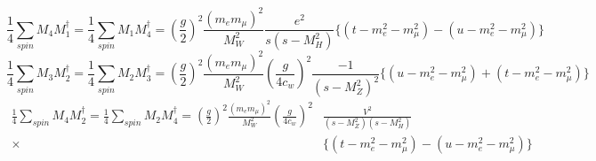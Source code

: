 \documentclass[11pt]{article}
\begin{document}
    \begin{equation}
    \frac{1}{4}\sum_{spin} M_4 M_1^{\dagger}=\frac{1}{4}\sum_{spin} M_1 M_4^{\dagger}=\left(\frac{g}{2}\right)^2\frac{(m_em_\mu)^2}{M_W^2}\frac{e^2}{s(s-M_H^2)}\{ (t-m_e^2-m_\mu^2)-(u-m_e^2-m_\mu^2) \}
    \end{equation}
    \begin{equation}
    \frac{1}{4}\sum_{spin} M_3 M_2^{\dagger}=\frac{1}{4}\sum_{spin} M_2 M_3^{\dagger}=\left(\frac{g}{2}\right)^2\frac{(m_em_\mu)^2}{M_W^2}\left(\frac{g}{4c_w}\right)^2\frac{-1}{(s-M_Z^2)^2}\{ (u-m_e^2-m_\mu^2)+(t-m_e^2-m_\mu^2) \}
    \end{equation}
    \begin{equation}
    \begin{split}
    \frac{1}{4}\sum_{spin} M_4 M_2^{\dagger}=\frac{1}{4}\sum_{spin} M_2 M_4^{\dagger}=\left(\frac{g}{2}\right)^2\frac{(m_em_\mu)^2}{M_W^2}\left(\frac{g}{4c_w}\right)^2&\frac{V^2}{(s-M_Z^2)(s-M_H^2)}\\
    \times&\{ (t-m_e^2-m_\mu^2)-(u-m_e^2-m_\mu^2) \}
    \end{split}
    \end{equation}
\end{document}
